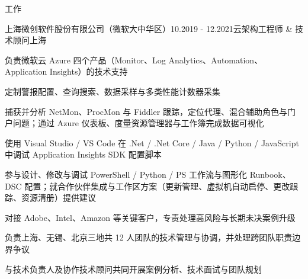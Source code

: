 \documentclass{resume} %
\begin{document}
\begin{rSection}{工作}
  \begin{rSubsection}{上海微创软件股份有限公司（微软大中华区）}{10.2019 - 12.2021}{云架构工程师 \& 技术顾问}{上海}
    \item 负责微软云 Azure 四个产品（Monitor、Log Analytics、Automation、Application Insights）的技术支持
    \item 定制警报配置、查询搜索、数据采样与多类性能计数器采集
    \item 捕获并分析 NetMon、ProcMon 与 Fiddler 跟踪，定位代理、混合辅助角色与门户问题；通过 Azure 仪表板、度量资源管理器与工作簿完成数据可视化
    \item 使用 Visual Studio / VS Code 在 .Net / .Net Core / Java / Python / JavaScript 中调试 Application Insights SDK 配置脚本
    \item 参与设计、修改与调试 PowerShell / Python / PS 工作流与图形化 Runbook、DSC 配置；就合作伙伴集成与工作区方案（更新管理、虚拟机自动启停、更改跟踪、资源清册）提供建议
    \item 对接 Adobe、Intel、Amazon 等关键客户，专责处理高风险与长期未决案例升级
    \item 负责上海、无锡、北京三地共 12 人团队的技术管理与协调，并处理跨团队职责边界争议
    \item 与技术负责人及协作技术顾问共同开展案例分析、技术面试与团队规划
  \end{rSubsection}

\end{rSection}
\end{document}
